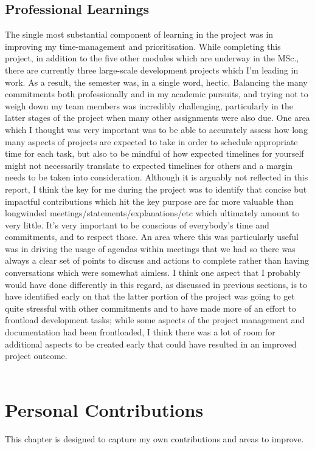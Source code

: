 \documentclass{scrreprt}
\begin{document}
\section{Professional Learnings}\label{LrnProf}
The single most substantial component of learning in the project was in improving my time-management and prioritisation. While completing this project, in addition to the five other modules which are underway in the MSc., there are currently three large-scale development projects which I'm leading in work. As a result, the semester was, in a single word, hectic. Balancing the many commitments both professionally and in my academic pursuits, and trying not to weigh down my team members was incredibly challenging, particularly in the latter stages of the project when many other assignments were also due. One area which I thought was very important was to be able to accurately assess how long many aspects of projects are expected to take in order to schedule appropriate time for each task, but also to be mindful of how expected timelines for yourself might not necessarily translate to expected timelines for others and a margin needs to be taken into consideration. Although it is arguably not reflected in this report, I think the key for me during the project was to identify that concise but impactful contributions which hit the key purpose are far more valuable than longwinded meetings/statements/explanations/etc which ultimately amount to very little. It's very important to be conscious of everybody's time and commitments, and to respect those. An area where this was particularly useful was in driving the usage of agendas within meetings that we had so there was always a clear set of points to discuss and actions to complete rather than having conversations which were somewhat aimless. I think one aspect that I probably would have done differently in this regard, as discussed in previous sections, is to have identified early on that the latter portion of the project was going to get quite stressful with other commitments and to have made more of an effort to frontload development tasks; while some aspects of the project management and documentation had been frontloaded, I think there was a lot of room for additional aspects to be created early that could have resulted in an improved project outcome.\\
\\

\pagebreak
\chapter{Personal Contributions}\label{Contributions}
This chapter is designed to capture my own contributions and areas to improve.
\end{document}
